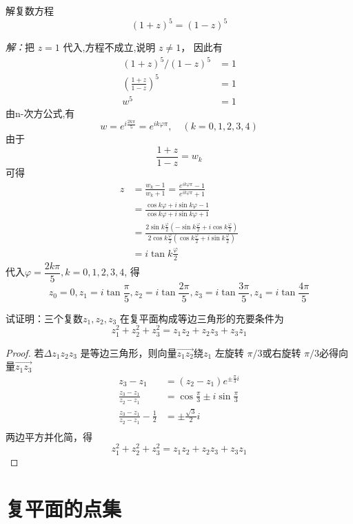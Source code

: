 \begin{example}
解复数方程 
\[ (1+z)^5 = (1-z)^5\]
\end{example}
\emph{解：}把 $z=1$ 代入,方程不成立,说明 $z \ne 1$， 因此有 
\[ \begin{aligned}
    (1+z)^5 /(1-z)^5 &=  1 \\ 
    \left( \frac{1+z}{1-z}\right) ^5 &=1 \\
    w ^5 &= 1
\end{aligned}\]
由n-次方公式,有
\[ w = e^{i\frac{2k\pi}{5}} =  e^{i k\varphi\pi} , \quad (k=0,1,2,3,4)\]
 由于
 \[ \frac{1+z}{1-z}= w_k \]
 可得
 \[ \begin{aligned}   
   z &= \frac{w_k -1 }{w_k + 1} = \frac{e^{i k\varphi\pi} -1 }{e^{i k\varphi\pi} + 1}  \\ 
    &= \frac{\cos k \varphi + i \sin k \varphi -1 }{\cos k \varphi + i \sin k \varphi + 1}  \\ 
    &= \frac{2 \sin k\frac{\varphi}{2}\left(-\sin k\frac{\varphi}{2}+i \cos k\frac{\varphi}{2}\right)}{2 \cos k\frac{\varphi}{2}\left(\cos k\frac{\varphi}{2}+i \sin k\frac{\varphi}{2}\right)} \\
    &= i \tan k\frac{\varphi}{2} 
 \end{aligned}\]
 代入$\varphi = \dfrac{2k\pi}{5}, k=0,1,2,3,4 $, 得
 \[ z_0 = 0, z_1= i \tan \frac{\pi}{5} , z_2= i \tan \frac{2\pi}{5}, z_3 = i \tan \frac{3\pi}{5}, z_4 = i \tan \frac{4\pi}{5}\]
\begin{example}
 试证明：三个复数$z_1, z_2, z_3$ 在复平面构成等边三角形的充要条件为
 \[z^2_1 + z^2_2 + z^2_3  = z_1 z_2 + z_2 z_3 + z_3 z_1\]
\end{example}
\begin{proof}
若$\Delta z_1 z_2 z_3$ 是等边三角形，则向量$\overrightarrow{z_1 z_2}$绕$z_1$ 左旋转 $\pi/3$或右旋转 $\pi/3$必得向量$\overrightarrow{z_1 z_3}$
\[\begin{aligned}
    z_3 - z_1  &= (z_2 - z_1)e^{\pm \frac{\pi}{3} i} \\ 
    \frac{z_3 - z_1  }{z_2 - z_1}&= \cos \frac{\pi}{3} \pm i \sin \frac{\pi}{3} \\
    \frac{z_3 - z_1  }{z_2 - z_1} - \frac{1}{2}&= \pm \frac{\sqrt{3}}{2}  i \\
\end{aligned}\]
两边平方并化简，得 
\[z^2_1 + z^2_2 + z^2_3  = z_1 z_2 + z_2 z_3 + z_3 z_1\]
\end{proof}    


\section{复平面的点集}\label{sec:order}

